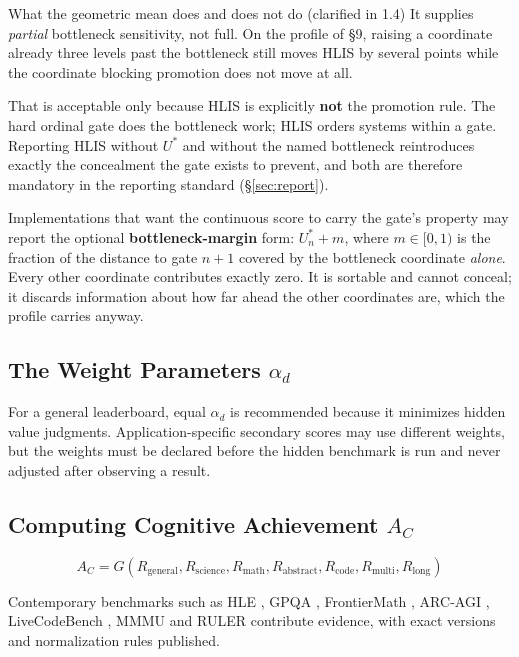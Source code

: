 \documentclass[11pt]{article}
\theoremstyle{definition}
\begin{document}
\begin{cautionbox}{What the geometric mean does and does not do (clarified in 1.4)}
It supplies \emph{partial} bottleneck sensitivity, not full. On the profile of \S9, raising a coordinate already three levels past the bottleneck still moves HLIS by several points while the coordinate blocking promotion does not move at all.

That is acceptable only because HLIS is explicitly \textbf{not} the promotion rule. The hard ordinal gate does the bottleneck work; HLIS orders systems within a gate. Reporting HLIS without $U^{*}$ and without the named bottleneck reintroduces exactly the concealment the gate exists to prevent, and both are therefore mandatory in the reporting standard (\S\ref{sec:report}).

Implementations that want the continuous score to carry the gate's property may report the optional \textbf{bottleneck-margin} form: $U^{*}_n + m$, where $m \in [0,1)$ is the fraction of the distance to gate $n{+}1$ covered by the bottleneck coordinate \emph{alone}. Every other coordinate contributes exactly zero. It is sortable and cannot conceal; it discards information about how far ahead the other coordinates are, which the profile carries anyway.
\end{cautionbox}

\subsection{The Weight Parameters \texorpdfstring{$\alpha_d$}{alpha-d}}

\sloppy For a general leaderboard, equal $\alpha_d$ is recommended because it minimizes hidden value judgments. Application-specific secondary scores may use different weights, but the weights must be declared before the hidden benchmark is run and never adjusted after observing a result.

\subsection{Computing Cognitive Achievement \texorpdfstring{$A_C$}{A-C}}

\begin{equation}
A_C = G(R_{\text{general}}, R_{\text{science}}, R_{\text{math}}, R_{\text{abstract}}, R_{\text{code}}, R_{\text{multi}}, R_{\text{long}})
\end{equation}

Contemporary benchmarks such as HLE \citep{phan2025hle}, GPQA \citep{rein2023gpqa}, FrontierMath \citep{glazer2024frontiermath}, ARC-AGI \citep{arc2026}, LiveCodeBench \citep{jain2024livecodebench}, MMMU \citep{yue2023mmmu} and RULER \citep{hsieh2024ruler} contribute evidence, with exact versions and normalization rules published.
\end{document}
